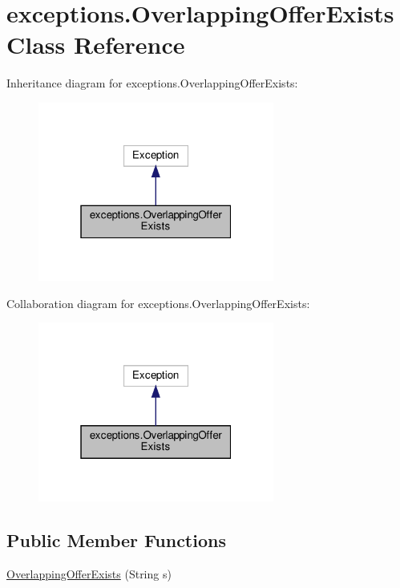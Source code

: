 \hypertarget{classexceptions_1_1_overlapping_offer_exists}{}\section{exceptions.\+Overlapping\+Offer\+Exists Class Reference}
\label{classexceptions_1_1_overlapping_offer_exists}


Inheritance diagram for exceptions.\+Overlapping\+Offer\+Exists\+:
\nopagebreak
\begin{figure}[H]
\begin{center}
\leavevmode
\includegraphics[width=220pt]{classexceptions_1_1_overlapping_offer_exists__inherit__graph}
\end{center}
\end{figure}


Collaboration diagram for exceptions.\+Overlapping\+Offer\+Exists\+:
\nopagebreak
\begin{figure}[H]
\begin{center}
\leavevmode
\includegraphics[width=220pt]{classexceptions_1_1_overlapping_offer_exists__coll__graph}
\end{center}
\end{figure}
\subsection*{Public Member Functions}
\begin{DoxyCompactItemize}
\item 
\mbox{\hyperlink{classexceptions_1_1_overlapping_offer_exists_a053baab9b6c9e1da073098c4cfbcdc45}{Overlapping\+Offer\+Exists}} (String s)
\end{DoxyCompactItemize}


